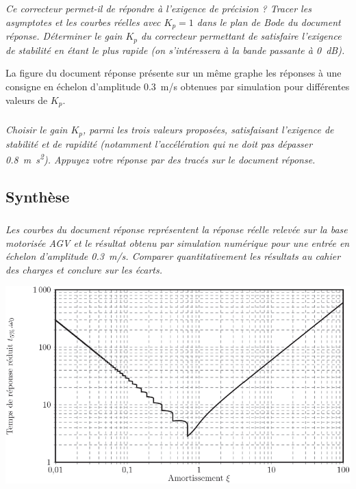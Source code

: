 \begin{multicols}{2}
\begin{multicols}{2}
\subparagraph{}
\textit{Ce correcteur permet-il de répondre à l’exigence de précision ? Tracer les asymptotes et les
courbes réelles avec $K_p = 1$ dans le plan de Bode du document réponse. Déterminer le
gain $K_p$ du correcteur permettant de satisfaire l’exigence de stabilité en étant le plus rapide (on
s’intéressera à la bande passante à \SI{0}{dB}).}
\ifprof
\begin{corrige}
\end{corrige}
\else
\fi

La figure du document réponse présente sur un même graphe les réponses à une consigne en
échelon d’amplitude \SI{0,3}{m/s} obtenues par simulation pour différentes valeurs de $K_p$.


\subparagraph{}
\textit{Choisir le gain $K_p$, parmi les trois valeurs proposées, satisfaisant l’exigence de stabilité et de
rapidité (notamment l’accélération qui ne doit pas dépasser \SI{0,8}{m.s^2}). Appuyez votre réponse
par des tracés sur le document réponse.}
\ifprof
\begin{corrige}
\end{corrige}
\else
\fi


\subsection*{Synthèse}
\subparagraph{}
\textit{Les courbes du document réponse représentent la réponse réelle relevée sur la base
motorisée AGV et le résultat obtenu par simulation numérique pour une entrée en échelon
d’amplitude \SI{0,3}{m/s}. Comparer quantitativement les résultats au cahier des charges et conclure
sur les écarts.}
\ifprof
\begin{corrige}
\end{corrige}
\else
\fi


\begin{center}
\includegraphics[width=\linewidth]{images/ccp_09}
\end{center}



\end{multicols}
\end{multicols}
